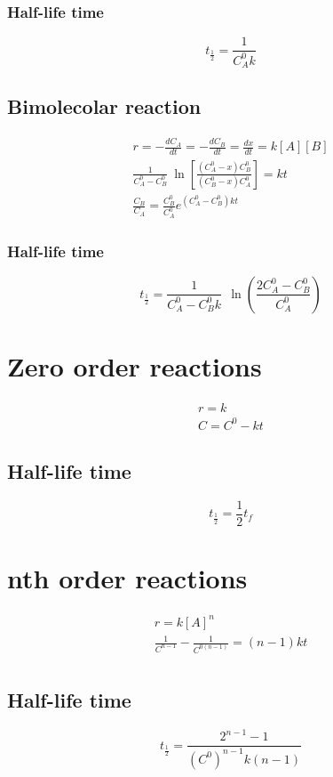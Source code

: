 \documentclass[../Master.tex]{subfiles}
\begin{document}
\begin{multicols}{2}
				   \subsubsection{Half-life time}
						    \[
								     t_{\frac{1}{2}} = \frac{1}{C_{A} ^{0}k}
						    \]

		  \subsection{Bimolecolar reaction}
				   \begin{gather*}
						    r = - \frac{dC_{A}}{dt} = - \frac{dC_{B}}{dt} = \frac{dx}{dt} = k[A][B] \\
						    \frac{1}{C_{A} ^{0} - C_{B} ^{0} }~\ln\left[\frac{(C_{A} ^{0} - x)C_{B} ^{0} }{(C_{B} ^{0} - x) C_{A} ^{0} }\right] = kt\\
						    \frac{C_{B}}{C_{A}} = \frac{C_{B} ^{0} }{C_{A} ^{0} }e^{(C_{A} ^{0}-C_{B} ^{0}  )kt}
				   \end{gather*}

				   \subsubsection{Half-life time}
						    \[
								     t_{\frac{1}{2}} = \frac{1}{C_{A} ^{0} - C_{B} ^{0} k}~ ~  \ln\left(  \frac{2C_{A} ^{0} - C_{B}^{0} }{C_{A}^{0}} \right)
						    \]

		 \section{Zero order reactions}
		  \begin{gather*}
				   r = k\\
				   C = C^0 - kt
		  \end{gather*}
		  \subsection{Half-life time}
				   \[
						    t_{\frac{1}{2}}  = \frac{1}{2}t_{f}
				   \]
		 \section{nth order reactions}
		  \begin{gather*}
				   r = k[A]^{n} \\
				   \frac{1}{C^{n-1} } - \frac{1}{C^{0(n-1 )} } = (n-1)kt\\
		  \end{gather*}
		  \subsection{Half-life time}
				   \[
						    t_{\frac{1}{2}} = \frac{2^{n-1} -1 }{(C^{0} )^{n-1} k(n-1)}
				   \]


\end{multicols}
\end{document}
